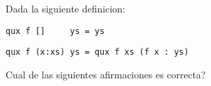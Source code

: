 \documentclass{gift}
\begin{document}
\begin{giftFragmento}
\end  {giftFragmento}


\begin{giftComentario}
 
\end  {giftComentario}

\begin{giftComentario}
 
\end  {giftComentario}
\begin{giftFragmento}
Dada la siguiente definicion:\end  {giftFragmento}

\verb!qux f []     ys = ys!
\begin{giftFragmento}
\end  {giftFragmento}

\verb!qux f (x:xs) ys = qux f xs (f x : ys)!
\begin{giftFragmento}
Cual de las siguientes afirmaciones es correcta?\end  {giftFragmento}
\end{document}
